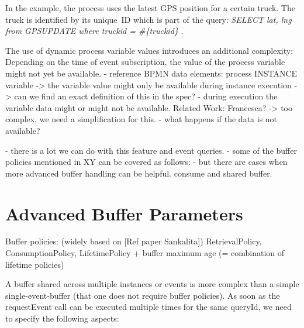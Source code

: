 In the example, the process uses the latest GPS position for a certain truck. The truck is identified by its unique~ID which is part of the query: \textit{SELECT lat, lng from GPSUPDATE where truckid = \#\{truckid\} }.

The use of dynamic process variable values introduces an additional complexity: Depending on the time of event subscription, the value of the process variable might not yet be available.
- reference BPMN data elements: process INSTANCE variable
-> the variable value might only be available during instance execution
-> can we find an exact definition of this in the spec?
- during execution the variable data might or might not be available. Related Work: Francesca?
-> too complex, we need a simplification for this.
- what happens if the data is not available?








- there is a lot we can do with this feature and event queries.
- some of the buffer policies mentioned in XY can be covered as follows:
- but there are cases when more advanced buffer handling can be helpful. consume and shared buffer.


\section{Advanced Buffer Parameters}

Buffer policies:
(widely based on [Ref paper Sankalita]) RetrievalPolicy, ConsumptionPolicy, LifetimePolicy
+ buffer maximum age (= combination of lifetime policies)

A buffer shared across multiple instances or events is more complex than a simple single-event-buffer (that one does not require buffer policies). As soon as the requestEvent call can be executed multiple times for the same queryId, we need to specify the following aspects:

